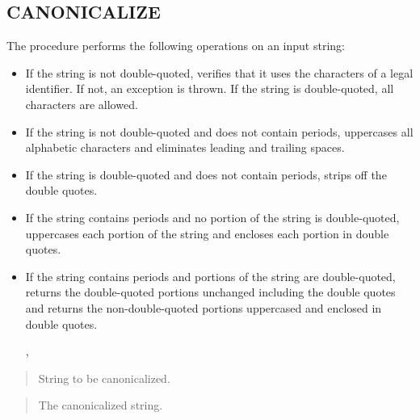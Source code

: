 \documentclass[letterpaper,10pt,english,openany,oneside]{sphinxmanual}
\begin{document}
\newpage


\subsection{CANONICALIZE}
\label{\detokenize{dbms_utility:canonicalize}}
The  procedure performs the following operations on an input
string:
\begin{itemize}
\item {} 
If the string is not double-quoted, verifies that it uses the characters of a legal identifier. If not, an exception is thrown. If the string is double-quoted, all characters are allowed.

\item {} 
If the string is not double-quoted and does not contain periods, uppercases all alphabetic characters and eliminates leading and trailing spaces.

\item {} 
If the string is double-quoted and does not contain periods, strips off the double quotes.

\item {} 
If the string contains periods and no portion of the string is double-quoted, uppercases each portion of the string and encloses each portion in double quotes.

\item {} 
If the string contains periods and portions of the string are double-quoted, returns the double-quoted portions unchanged including the double quotes and returns the non-double-quoted portions uppercased and enclosed in double quotes.

,


\end{itemize}


\begin{quote}

String to be canonicalized.
\end{quote}

\begin{quote}

The canonicalized string.
\end{quote}
\end{document}
